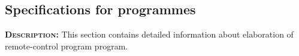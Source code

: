 \subsection{Specifications for programmes}
	\textsc{\textbf{Description:}} This section contains detailed information about elaboration of remote-control program program.
	
	
